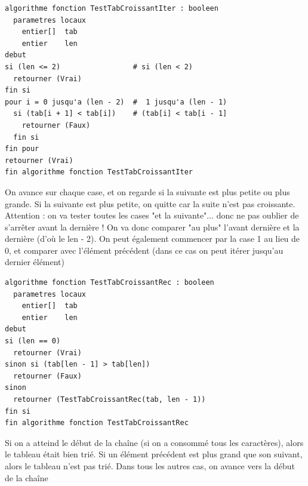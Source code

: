 \documentclass[11pt,a4paper]{article}
\begin{document}
\begin{table}[ht!]
  \centering
\begin{lstlisting}[style=algorithmique]
algorithme fonction TestTabCroissantIter : booleen
  parametres locaux
    entier[]  tab
    entier    len
debut
si (len <= 2)                 # si (len < 2)
  retourner (Vrai)
fin si
pour i = 0 jusqu'a (len - 2)  #  1 jusqu'a (len - 1)
  si (tab[i + 1] < tab[i])    # (tab[i] < tab[i - 1]
    retourner (Faux)
  fin si
fin pour
retourner (Vrai)
fin algorithme fonction TestTabCroissantIter \end{lstlisting}
  \caption{On avance sur chaque case, et on regarde si la suivante est plus petite ou plus grande. Si la suivante est plus petite, on quitte car la suite n'est pas croissante. Attention : on va tester toutes les cases "et la suivante"... donc ne pas oublier de s'arrêter avant la dernière ! On va donc comparer "au plus" l'avant dernière et la dernière (d'où le len - 2). On peut également commencer par la case 1 au lieu de 0, et comparer avec l'élément précédent (dans ce cas on peut itérer jusqu'au dernier élément)}
\end{table}


\begin{table}[ht!]
  \centering
\begin{lstlisting}[style=algorithmique]
algorithme fonction TestTabCroissantRec : booleen
  parametres locaux
    entier[]  tab
    entier    len
debut
si (len == 0)
  retourner (Vrai)
sinon si (tab[len - 1] > tab[len])
  retourner (Faux)
sinon
  retourner (TestTabCroissantRec(tab, len - 1))
fin si
fin algorithme fonction TestTabCroissantRec \end{lstlisting}
  \caption{Si on a atteind le début de la chaîne (si on a consommé tous les caractères), alors le tableau était bien trié. Si un élément précédent est plus grand que son suivant, alors le tableau n'est pas trié. Dans tous les autres cas, on avance vers la début de la chaîne}
\end{table}



\newpage

\vfillFirst

\end{document}

